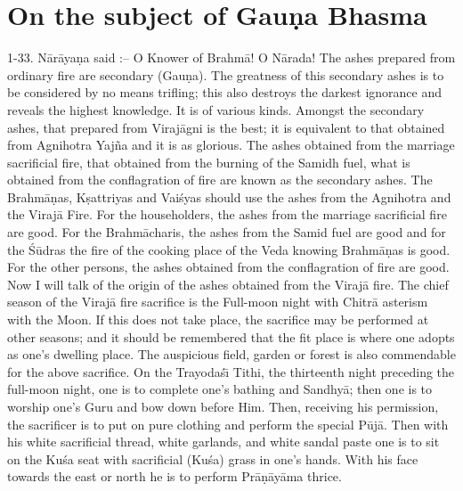 \chapter{On the subject of Gau\d{n}a Bhasma}

1-33. N\=ar\=aya\d{n}a said :-- O Knower of Brahm\=a! O N\=arada! The ashes prepared from ordinary fire are secondary (Gau\d{n}a). The greatness of this secondary ashes is to be considered by no means trifling; this also destroys the darkest ignorance and reveals the highest knowledge. It is of various kinds. Amongst the secondary ashes, that prepared from Viraj\=agni is the best; it is equivalent to that obtained from Agnihotra Yaj\~na and it is as glorious. The ashes obtained from the marriage sacrificial fire, that obtained from the burning of the Samidh fuel, what is obtained from the conflagration of fire are known as the secondary ashes. The Brahm\=a\d{n}as, K\d{s}attriyas and Vai\'syas should use the ashes from the Agnihotra and the Viraj\=a Fire. For the householders, the ashes from the marriage sacrificial fire are good. For the Brahm\=acharis, the ashes from the Samid fuel are good and for the \'S\=udras the fire of the cooking place of the Veda knowing Brahm\=a\d{n}as is good. For the other persons, the ashes obtained from the conflagration of fire are good. Now I will talk of the origin of the ashes obtained from the Viraj\=a fire. The chief season of the Viraj\=a fire sacrifice is the Full-moon night with Chitr\=a asterism with the Moon. If this does not take place, the sacrifice may be performed at other seasons; and it should be remembered that the fit place is where one adopts as one's dwelling place. The auspicious field, garden or forest is also commendable for the above sacrifice. On the Trayoda\'s\={\i} Tithi, the thirteenth night preceding the full-moon night, one is to complete one's bathing and Sandhy\=a; then one is to worship one's Guru and bow down before Him. Then, receiving his permission, the sacrificer is to put on pure clothing and perform the special P\=uj\=a. Then with his white sacrificial thread, white garlands, and white sandal paste one is to sit on the Ku\'sa seat with sacrificial (Ku\'sa) grass in one's hands. With his face towards the east or north he is to perform Pr\=a\d{n}\=ay\=ama thrice.

